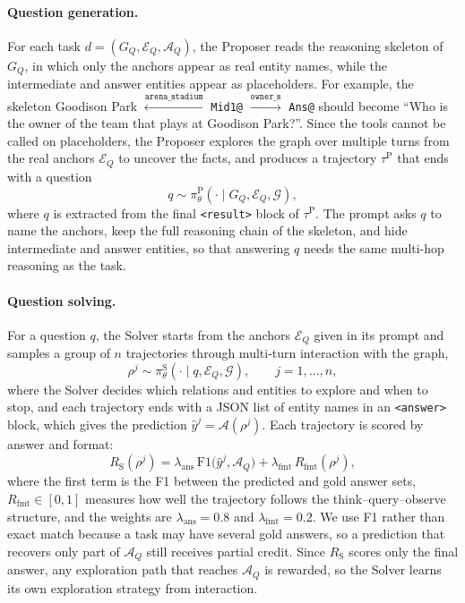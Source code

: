 \paragraph{Question generation.}
For each task $d=(G_Q,\mathcal{E}_Q,\mathcal{A}_Q)$, the Proposer reads the reasoning skeleton of $G_Q$, in which only the anchors appear as real entity names, while the intermediate and answer entities appear as placeholders. For example, the skeleton Goodison Park $\xleftarrow{\texttt{arena\_stadium}}$ \texttt{Mid1@} $\xrightarrow{\texttt{owner\_s}}$ \texttt{Ans@} should become ``Who is the owner of the team that plays at Goodison Park?''. Since the tools cannot be called on placeholders, the Proposer explores the graph over multiple turns from the real anchors $\mathcal{E}_Q$ to uncover the facts, and produces a trajectory $\tau^{\mathrm{P}}$ that ends with a question
\begin{equation}
\label{eq:propose}
q\sim\pi_\theta^{\mathrm{P}}(\cdot\mid G_Q,\mathcal{E}_Q,\mathcal{G}),
\end{equation}
where $q$ is extracted from the final \texttt{<result>} block of $\tau^{\mathrm{P}}$. The prompt asks $q$ to name the anchors, keep the full reasoning chain of the skeleton, and hide intermediate and answer entities, so that answering $q$ needs the same multi-hop reasoning as the task.

\paragraph{Question solving.}
For a question $q$, the Solver starts from the anchors $\mathcal{E}_Q$ given in its prompt and samples a group of $n$ trajectories through multi-turn interaction with the graph,
\begin{equation}
\label{eq:solve}
\rho^{j}\sim\pi_\theta^{\mathrm{S}}(\cdot\mid q,\mathcal{E}_Q,\mathcal{G}),\qquad j=1,\ldots,n,
\end{equation}
where the Solver decides which relations and entities to explore and when to stop, and each trajectory ends with a JSON list of entity names in an \texttt{<answer>} block, which gives the prediction $\hat{y}^{j}=\mathcal{A}(\rho^{j})$. Each trajectory is scored by answer and format:
\begin{equation}
\label{eq:rs}
R_{\mathrm{S}}(\rho^{j})=\lambda_{\mathrm{ans}}\,\mathrm{F1}\bigl(\hat{y}^{j},\mathcal{A}_Q\bigr)+\lambda_{\mathrm{fmt}}\,R_{\mathrm{fmt}}(\rho^{j}),
\end{equation}
where the first term is the F1 between the predicted and gold answer sets, $R_{\mathrm{fmt}}\!\in\![0,1]$ measures how well the trajectory follows the think--query--observe structure, and the weights are $\lambda_{\mathrm{ans}}=0.8$ and $\lambda_{\mathrm{fmt}}=0.2$. We use F1 rather than exact match because a task may have several gold answers, so a prediction that recovers only part of $\mathcal{A}_Q$ still receives partial credit. Since $R_{\mathrm{S}}$ scores only the final answer, any exploration path that reaches $\mathcal{A}_Q$ is rewarded, so the Solver learns its own exploration strategy from interaction.


